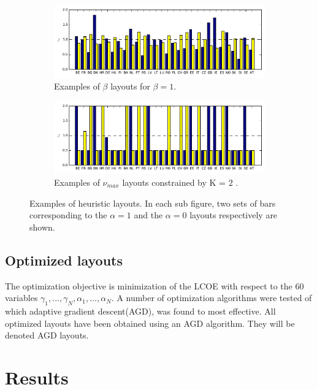 \documentclass[a4paper, 5p, sort&compress]{elsarticle}%
\newcommand{\chromowidth}{1.00 \columnwidth}
\begin{document}
\begin{figure}[h!]
  \centering
  \begin{subfigure}{2\columnwidth}
    \includegraphics[width = \chromowidth, center]{beta=1}
    \caption{Examples of $\beta$ layouts for $\beta = 1$.}
    \label{fig:betaExamples}    
  \end{subfigure}
  \begin{subfigure}{2\columnwidth}
    \includegraphics[width = \chromowidth, center]{k=2cfMax}
    \caption{Examples of $\nu_{max}$ layouts constrained by K = 2 .}
    \label{fig:cfMaxExamples}    
  \end{subfigure}
  \caption{Examples of heuristic layouts. In each sub figure, two sets of bars
    corresponding to the $\alpha = 1$ and the $\alpha = 0$ layouts respectively
    are shown.}
  \label{fig:examples}
\end{figure}

\subsection{Optimized layouts}
\label{sec:optimized-layouts}

The optimization objective is minimization of the LCOE with respect to
the 60 variables
$\gamma_{1}, ..., \gamma_{N}, \alpha_{1}, ..., \alpha_{N}$.  A number of optimization
algorithms were tested of which adaptive gradient
descent(AGD),%
was found to most effective. All optimized layouts have been obtained
using an AGD algorithm. They will be denoted AGD layouts.

\section{Results}
\label{sec:results}
\end{document}
